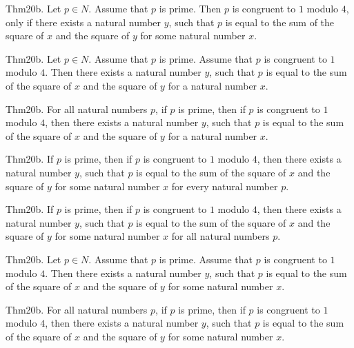 \documentclass{article}
\begin{document}
Thm20b. Let $p \in N$. Assume that $p$ is prime. Then $p$ is congruent to $1$ modulo $4$, only if there exists a natural number $y$, such that $p$ is equal to the sum of the square of $x$ and the square of $y$ for some natural number $x$.

Thm20b. Let $p \in N$. Assume that $p$ is prime. Assume that $p$ is congruent to $1$ modulo $4$. Then there exists a natural number $y$, such that $p$ is equal to the sum of the square of $x$ and the square of $y$ for a natural number $x$.

Thm20b. For all natural numbers $p$, if $p$ is prime, then if $p$ is congruent to $1$ modulo $4$, then there exists a natural number $y$, such that $p$ is equal to the sum of the square of $x$ and the square of $y$ for a natural number $x$.

Thm20b. If $p$ is prime, then if $p$ is congruent to $1$ modulo $4$, then there exists a natural number $y$, such that $p$ is equal to the sum of the square of $x$ and the square of $y$ for some natural number $x$ for every natural number $p$.

Thm20b. If $p$ is prime, then if $p$ is congruent to $1$ modulo $4$, then there exists a natural number $y$, such that $p$ is equal to the sum of the square of $x$ and the square of $y$ for some natural number $x$ for all natural numbers $p$.

Thm20b. Let $p \in N$. Assume that $p$ is prime. Assume that $p$ is congruent to $1$ modulo $4$. Then there exists a natural number $y$, such that $p$ is equal to the sum of the square of $x$ and the square of $y$ for some natural number $x$.

Thm20b. For all natural numbers $p$, if $p$ is prime, then if $p$ is congruent to $1$ modulo $4$, then there exists a natural number $y$, such that $p$ is equal to the sum of the square of $x$ and the square of $y$ for some natural number $x$.
\end{document}
